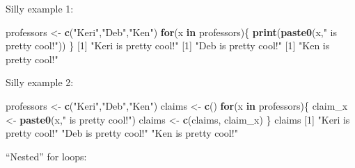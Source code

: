 \documentclass[]{book}
\newenvironment{Shaded}{\begin{snugshade}}{\end{snugshade}}
\newcommand{\ControlFlowTok}[1]{\textcolor[rgb]{0.13,0.29,0.53}{\textbf{#1}}}
\newcommand{\DecValTok}[1]{\textcolor[rgb]{0.00,0.00,0.81}{#1}}
\newcommand{\KeywordTok}[1]{\textcolor[rgb]{0.13,0.29,0.53}{\textbf{#1}}}
\newcommand{\NormalTok}[1]{#1}
\newcommand{\StringTok}[1]{\textcolor[rgb]{0.31,0.60,0.02}{#1}}
\begin{document}
Silly example 1:

\begin{Shaded}
\begin{Highlighting}[]
\NormalTok{professors <-}\StringTok{ }\KeywordTok{c}\NormalTok{(}\StringTok{"Keri"}\NormalTok{,}\StringTok{"Deb"}\NormalTok{,}\StringTok{"Ken"}\NormalTok{) }
\ControlFlowTok{for}\NormalTok{(x }\ControlFlowTok{in}\NormalTok{ professors)\{}
  \KeywordTok{print}\NormalTok{(}\KeywordTok{paste0}\NormalTok{(x,}\StringTok{" is pretty cool!"}\NormalTok{))}
\NormalTok{\}}
\NormalTok{[}\DecValTok{1}\NormalTok{] }\StringTok{"Keri is pretty cool!"}
\NormalTok{[}\DecValTok{1}\NormalTok{] }\StringTok{"Deb is pretty cool!"}
\NormalTok{[}\DecValTok{1}\NormalTok{] }\StringTok{"Ken is pretty cool!"}
\end{Highlighting}
\end{Shaded}

Silly example 2:

\begin{Shaded}
\begin{Highlighting}[]
\NormalTok{professors <-}\StringTok{ }\KeywordTok{c}\NormalTok{(}\StringTok{"Keri"}\NormalTok{,}\StringTok{"Deb"}\NormalTok{,}\StringTok{"Ken"}\NormalTok{) }
\NormalTok{claims <-}\StringTok{ }\KeywordTok{c}\NormalTok{()}
\ControlFlowTok{for}\NormalTok{(x }\ControlFlowTok{in}\NormalTok{ professors)\{}
\NormalTok{  claim_x <-}\StringTok{ }\KeywordTok{paste0}\NormalTok{(x,}\StringTok{" is pretty cool!"}\NormalTok{)}
\NormalTok{  claims <-}\StringTok{ }\KeywordTok{c}\NormalTok{(claims, claim_x)}
\NormalTok{\}}
\NormalTok{claims}
\NormalTok{[}\DecValTok{1}\NormalTok{] }\StringTok{"Keri is pretty cool!"} \StringTok{"Deb is pretty cool!"}  \StringTok{"Ken is pretty cool!"} 
\end{Highlighting}
\end{Shaded}

``Nested'' for loops:
\end{document}
